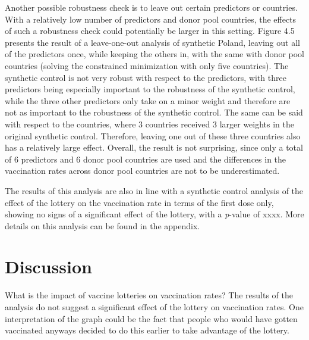 \documentclass{scrbook}
\begin{document}
Another possible robustness check is to leave out certain predictors or
countries. With a relatively low number of predictors and donor pool
countries, the effects of such a robustness check could potentially be
larger in this setting. Figure 4.5 presents the result of a
leave-one-out analysis of synthetic Poland, leaving out all of the
predictors once, while keeping the others in, with the same with donor
pool countries (solving the constrained minimization with only five
countries). The synthetic control is not very robust with respect to the
predictors, with three predictors being especially important to the
robustness of the synthetic control, while the three other predictors
only take on a minor weight and therefore are not as important to the
robustness of the synthetic control. The same can be said with respect
to the countries, where 3 countries received 3 larger weights in the
original synthetic control. Therefore, leaving one out of these three
countries also has a relatively large effect. Overall, the result is not
surprising, since only a total of 6 predictors and 6 donor pool
countries are used and the differences in the vaccination rates across
donor pool countries are not to be underestimated.

The results of this analysis are also in line with a synthetic control
analysis of the effect of the lottery on the vaccination rate in terms
of the first dose only, showing no signs of a significant effect of the
lottery, with a \textit{p}-value of xxxx. More details on this analysis
can be found in the appendix.

\chapter{Discussion}

What is the impact of vaccine lotteries on vaccination rates? The
results of the analysis do not suggest a significant effect of the
lottery on vaccination rates. One interpretation of the graph could be
the fact that people who would have gotten vaccinated anyways decided to
do this earlier to take advantage of the lottery.
\end{document}
